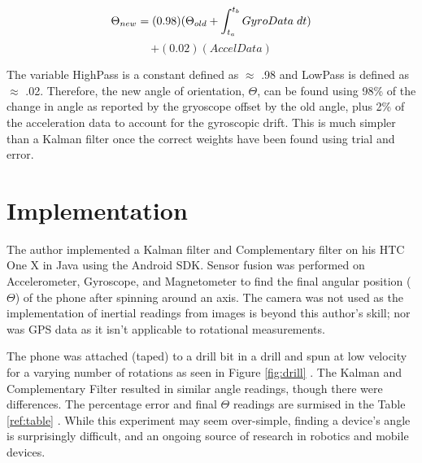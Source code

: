 \documentclass{acm_proc_article-sp}
\begin{document}
$$ \Theta_{new} = (0.98)( \Theta_{old}+ \int_{t_a}^{t_b} GyroData \hspace{1 mm} dt )$$  $$ + (0.02)(AccelData)  $$

The variable HighPass is a constant defined as $\approx$ .98 and LowPass is defined as $\approx$ .02.  Therefore, the new angle of orientation, $\Theta$, can be found using 98\% of the change in angle as reported by the gryoscope offset by the old angle, plus 2\% of the acceleration data to
account for the gyroscopic drift.\cite{comp}  This is much simpler than a Kalman filter once the correct weights have been found using trial and error.

\section{Implementation}
The author implemented a Kalman filter and Complementary filter on his HTC One X in Java using the Android SDK.  Sensor fusion was performed on Accelerometer, Gyroscope, and Magnetometer to find the final angular position ($\Theta$) of the phone after spinning around an axis.  The camera was not used as the implementation of inertial readings from images is beyond this author's skill; nor was GPS data as it isn't applicable to rotational measurements.

 The phone was attached (taped) to a drill bit in a drill and spun at low velocity for a varying number of rotations as seen in Figure \ref{fig:drill} .  The Kalman and Complementary Filter resulted in similar angle readings, though there were differences. The percentage error and final $\Theta$ readings are surmised in the Table \ref{ref:table} .  While this experiment may seem over-simple, finding a device's angle is surprisingly difficult, and an ongoing source of research in robotics and mobile devices.\cite{barshan1995inertial}
\end{document}
